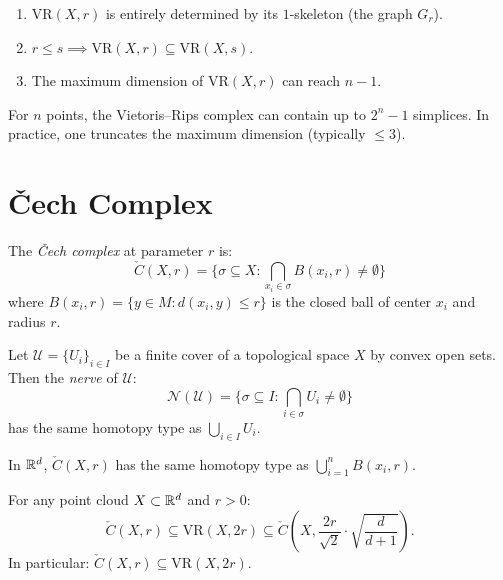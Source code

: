 \begin{proposition}[Properties]
\begin{enumerate}
  \item $\mathrm{VR}(X, r)$ is entirely determined by its $1$-skeleton
        (the graph $G_r$).
  \item $r \leq s \implies \mathrm{VR}(X, r) \subseteq \mathrm{VR}(X, s)$.
  \item The maximum dimension of $\mathrm{VR}(X, r)$ can reach $n - 1$.
\end{enumerate}
\end{proposition}

\begin{warning}[title=\textbf{Combinatorial Explosion}]
For $n$ points, the Vietoris--Rips complex can contain up to
$2^n - 1$ simplices. In practice, one truncates the maximum dimension
(typically $\leq 3$).
\end{warning}

\section{\v{C}ech Complex}

\begin{definition}
The \emph{\v{C}ech complex} at parameter $r$ is:
\[
  \check{C}(X, r) = \big\{
    \sigma \subseteq X : \bigcap_{x_i \in \sigma} B(x_i, r) \neq \emptyset
  \big\}
\]
where $B(x_i, r) = \{y \in M : d(x_i, y) \leq r\}$ is the closed ball
of center $x_i$ and radius $r$.
\end{definition}

\begin{theorem}
Let $\mathcal{U} = \{U_i\}_{i \in I}$ be a finite cover of a
topological space $X$ by convex open sets. Then the \emph{nerve} of
$\mathcal{U}$:
\[
  \mathcal{N}(\mathcal{U}) = \big\{
    \sigma \subseteq I : \bigcap_{i \in \sigma} U_i \neq \emptyset
  \big\}
\]
has the same homotopy type as $\bigcup_{i \in I} U_i$.
\end{theorem}

\begin{corollary}
In $\mathbb{R}^d$, $\check{C}(X, r)$ has the same homotopy type as
$\bigcup_{i=1}^n B(x_i, r)$.
\end{corollary}

\begin{proposition}
For any point cloud $X \subset \mathbb{R}^d$ and $r > 0$:
\[
  \check{C}(X, r) \subseteq \mathrm{VR}(X, 2r) \subseteq
  \check{C}\left(X, \frac{2r}{\sqrt{2}} \cdot \sqrt{\frac{d}{d+1}}\right).
\]
In particular: $\check{C}(X, r) \subseteq \mathrm{VR}(X, 2r)$.
\end{proposition}

